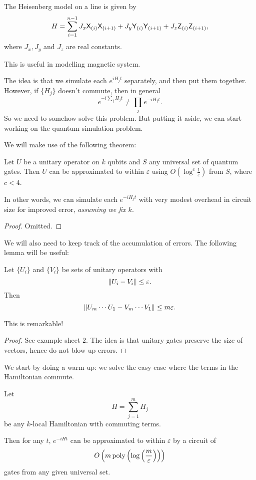 \begin{eg}
  The Heisenberg model on a line is given by
  \[
    H = \sum_{i = 1}^{n - 1} J_x \mathsf{X}_{(i)} \mathsf{X}_{(i + 1)} + J_y \mathsf{Y}_{(i)}\mathsf{Y}_{(i + 1)} + J_z \mathsf{Z}_{(i)} \mathsf{Z}_{(i + 1)},
  \]
  where $J_x, J_y$ and $J_z$ are real constants.

  This is useful in modelling magnetic system.
\end{eg}

The idea is that we simulate each $e^{iH_j t}$ separately, and then put them together. However, if $\{H_j\}$ doesn't commute, then in general
\[
  e^{-i\sum_j H_j t} \not= \prod_j e^{-iH_j t}.
\]
So we need to somehow solve this problem. But putting it aside, we can start working on the quantum simulation problem.

We will make use of the following theorem:
\begin{thm}
  Let $U$ be a unitary operator on $k$ qubits and $S$ any universal set of quantum gates. Then $U$ can be approximated to within $\varepsilon$ using $O(\log^c \frac{1}{\varepsilon})$ from $S$, where $c < 4$.
\end{thm}
In other words, we can simulate each $e^{-iH_j t}$ with very modest overhead in circuit size for improved error, \emph{assuming we fix $k$}.

\begin{proof}
  Omitted.
\end{proof}

We will also need to keep track of the accumulation of errors. The following lemma will be useful:
\begin{lemma}
  Let $\{U_i\}$ and $\{V_i\}$ be sets of unitary operators with
  \[
    \left\lVert U_i - V_i\right\rVert \leq \varepsilon.
  \]
  Then
  \[
    \left\lVert U_m \cdots U_1 - V_m \cdots V_1\right\rVert \leq m\varepsilon.
  \]
\end{lemma}
This is remarkable!

\begin{proof}
  See example sheet $2$. The idea is that unitary gates preserve the size of vectors, hence do not blow up errors.
\end{proof}

We start by doing a warm-up: we solve the easy case where the terms in the Hamiltonian commute.
\begin{prop}
  Let
  \[
    H = \sum_{j = 1}^m H_j
  \]
  be any $k$-local Hamiltonian with commuting terms.

  Then for any $t$, $e^{-iHt}$ can be approximated to within $\varepsilon$ by a circuit of
  \[
    O\left(m \operatorname{poly}\left(\log\left(\frac{m}{\varepsilon}\right)\right)\right)
  \]
  gates from any given universal set.
\end{prop}

